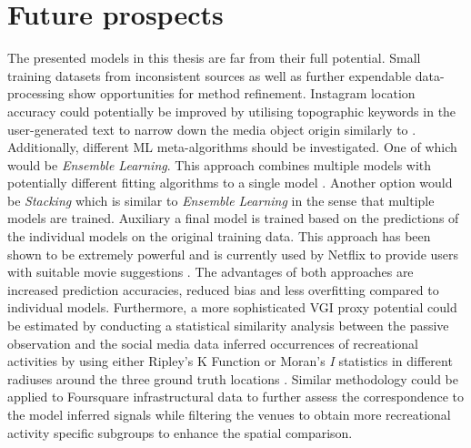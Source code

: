 \section{Future prospects} \label{future_prospects}
The presented models in this thesis are far from their full potential. Small training datasets from inconsistent sources as well as further expendable data-processing show opportunities for method refinement. Instagram location accuracy could potentially be improved by utilising topographic keywords in the user-generated text to narrow down the media object origin similarly to \parencite{Ostermann2015}. \\
Additionally, different ML meta-algorithms should be investigated. One of which would be \textit{Ensemble Learning}. This approach combines multiple models with potentially different fitting algorithms to a single model \parencite{Zhou2009}. Another option would be \textit{Stacking} which is similar to \textit{Ensemble Learning} in the sense that multiple models are trained. Auxiliary a final model is trained based on the predictions of the individual models on the original training data. This approach has been shown to be extremely powerful and is currently used by Netflix to provide users with suitable movie suggestions \parencite{AndreasToscher2009}. The advantages of both approaches are increased prediction accuracies, reduced bias and less overfitting compared to individual models. Furthermore, a more sophisticated VGI proxy potential could be estimated by conducting a statistical similarity analysis between the passive observation and the social media data inferred occurrences of recreational activities by using either Ripley's K Function or Moran's \textit{I} statistics in different radiuses around the three ground truth locations \parencite{OSullivan2003}. Similar methodology could be applied to Foursquare infrastructural data to further assess the correspondence to the model inferred signals while filtering the venues to obtain more recreational activity specific subgroups to enhance the spatial comparison. 



